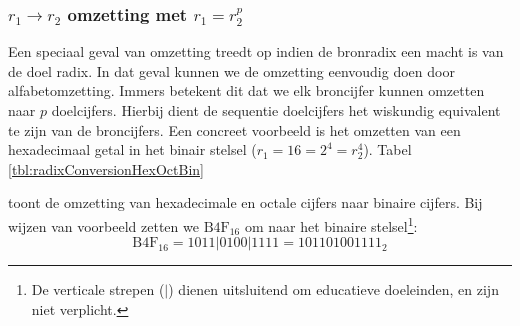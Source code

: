 \subsubsection{$r_1\rightarrow r_2$ omzetting met $r_1=r_2^p$}
Een speciaal geval van omzetting treedt op indien de bronradix een macht is van de doel radix. In dat geval kunnen we de omzetting eenvoudig doen door alfabetomzetting. Immers betekent dit dat we elk broncijfer kunnen omzetten naar $p$ doelcijfers. Hierbij dient de sequentie doelcijfers het wiskundig equivalent te zijn van de broncijfers. Een concreet voorbeeld is het omzetten van een hexadecimaal getal in het binair stelsel ($r_1=16=2^4=r_2^4$). Tabel \ref{tbl:radixConversionHexOctBin}
\begin{table}[hbt]
\centering
{}
\caption{Radix-conversie van hexadecimaal en octaal naar binair.}
\end{table}
toont de omzetting van hexadecimale en octale cijfers naar binaire cijfers. Bij wijzen van voorbeeld zetten we $\mbox{B4F}_{16}$ om naar het binaire stelsel\footnote{De verticale strepen ($|$) dienen uitsluitend om educatieve doeleinden, en zijn niet verplicht.}:
\begin{equation}
\mbox{B4F}_{16}=1011|0100|1111=101101001111_2
\end{equation}
